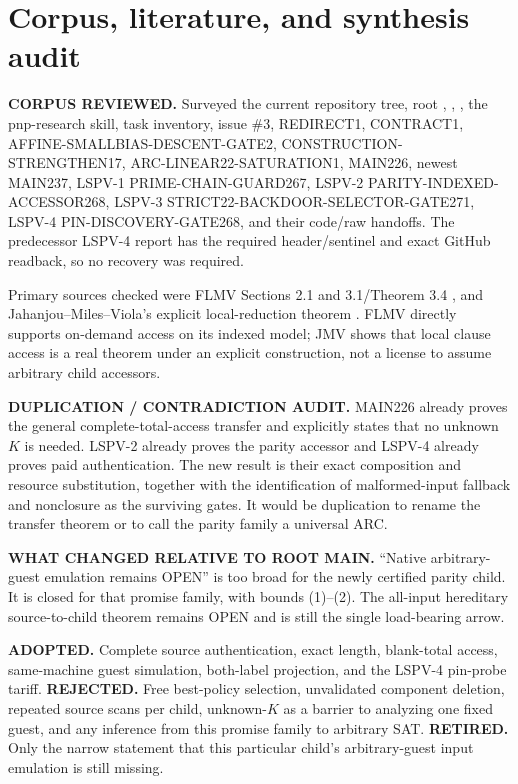 \documentclass[11pt]{article}
\begin{document}
\section{Corpus, literature, and synthesis audit}
\textbf{CORPUS REVIEWED.}  Surveyed the current repository tree, root
, , , the pnp-research skill,
task inventory, issue \#3, REDIRECT1, CONTRACT1,
AFFINE-SMALLBIAS-DESCENT-GATE2, CONSTRUCTION-STRENGTHEN17,
ARC-LINEAR22-SATURATION1, MAIN226, newest MAIN237, LSPV-1
PRIME-CHAIN-GUARD267, LSPV-2 PARITY-INDEXED-ACCESSOR268, LSPV-3
STRICT22-BACKDOOR-SELECTOR-GATE271, LSPV-4 PIN-DISCOVERY-GATE268, and
their code/raw handoffs.  The predecessor LSPV-4 report has the required
header/sentinel and exact GitHub readback, so no recovery was required.

Primary sources checked were FLMV Sections 2.1 and 3.1/Theorem 3.4
\cite{FLMV}, and Jahanjou--Miles--Viola's explicit local-reduction theorem
\cite{JMV}.  FLMV directly supports on-demand access on its indexed model;
JMV shows that local clause access is a real theorem under an explicit
construction, not a license to assume arbitrary child accessors.

\textbf{DUPLICATION / CONTRADICTION AUDIT.}  MAIN226 already proves the
general complete-total-access transfer and explicitly states that no unknown
$K$ is needed.  LSPV-2 already proves the parity accessor and LSPV-4 already
proves paid authentication.  The new result is their exact composition and
resource substitution, together with the identification of malformed-input
fallback and nonclosure as the surviving gates.  It would be duplication to
rename the transfer theorem or to call the parity family a universal ARC.

\textbf{WHAT CHANGED RELATIVE TO ROOT MAIN.}  ``Native arbitrary-guest
emulation remains OPEN'' is too broad for the newly certified parity child.
It is closed for that promise family, with bounds (1)--(2).  The all-input
hereditary source-to-child theorem remains OPEN and is still the single
load-bearing arrow.

\textbf{ADOPTED.}  Complete source authentication, exact length, blank-total
access, same-machine guest simulation, both-label projection, and the
LSPV-4 pin-probe tariff.  \textbf{REJECTED.}  Free best-policy selection,
unvalidated component deletion, repeated source scans per child, unknown-$K$
as a barrier to analyzing one fixed guest, and any inference from this promise
family to arbitrary SAT.  \textbf{RETIRED.}  Only the narrow statement that
this particular child's arbitrary-guest input emulation is still missing.
\end{document}
